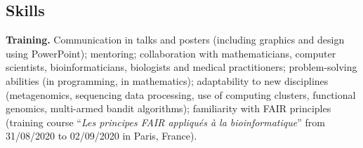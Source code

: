 \documentclass[11pt,a4paper,sans]{moderncv}
\begin{document}
\subsection{Skills}
\textbf{Training.} Communication in talks and posters (including graphics and design using PowerPoint); mentoring; collaboration with mathematicians, computer scientists, bioinformaticians, biologists and medical practitioners; problem-solving abilities (in programming, in mathematics); adaptability to new disciplines (metagenomics, sequencing data processing, use of computing clusters, functional genomics, multi-armed bandit algorithms); familiarity with FAIR principles (training course “\textit{Les principes FAIR appliqués à la bioinformatique}” from 31/08/2020 to 02/09/2020 in Paris, France).
\end{document}
